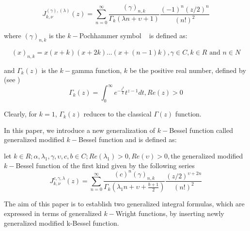 \documentclass{amsart}
\theoremstyle{plain}
\numberwithin{equation}{section}
\begin{document}
\begin{equation}
J_{k,\nu }^{\left( \gamma \right) ,\left( \lambda \right) }\left( z\right)
=\sum_{n=0}^{\infty }\frac{\left( \gamma \right) _{n,k}}{\Gamma _{k}\left(
\lambda n+\upsilon +1\right) }\frac{\left( -1\right) ^{n}\left( z/2\right)
^{n}}{\left( n!\right) ^{2}}  \label{k1}
\end{equation}

where $\left( \gamma \right) _{n,k}$ is the $k-$Pochhammer symbol \ \cite{Diaz} is defined as:

\begin{equation}
\left( x\right) _{n,k}=x\left( x+k\right) \left( x+2k\right) ...\left(
x+\left( n-1\right) k\right) ,\gamma \in C,k\in R\text{ and }n\in N
\label{k2}
\end{equation}

and $\Gamma _{k}(z)$ is the $k-$gamma function, $k$ be the positive real
number, defined by (see \cite{Diaz})\begin{equation}
\Gamma _{k}\left( z\right) =\int_{0}^{\infty }e^{-\frac{t^{k}}{k}}t^{z-1}dt,Re\left( z\right) >0  \label{k3}
\end{equation}

Clearly, for $k=1$, $\Gamma _{k}(z)$ reduces to the classical $\Gamma \left(
z\right) $ function.

In this paper, we introduce a new generalization of $k-$Bessel function
called generalized modified $k-$Bessel function and is defined as:

let $k\in R;\alpha ,\lambda _{1},\gamma ,\upsilon ,c,b\in C;Re\left( \lambda
_{1}\right) >0,Re\left( \upsilon \right) >0,$the generalized modified $k-$Bessel function of the first kind given by the following series\begin{equation}
J_{k,\nu }^{c,\gamma ,\lambda }\left( z\right) =\sum_{n=0}^{\infty }\frac{\left( c\right) ^{n}\left( \gamma \right) _{n,k}}{\Gamma _{k}\left( \lambda
_{1}n+\upsilon +\frac{b+1}{2}\right) }\frac{\left( z/2\right) ^{\upsilon +2n}}{\left( n!\right) ^{2}}  \label{k4}
\end{equation}

The aim of this paper is to establish two generalized integral formulas,
which are expressed in terms of generalized $k-$Wright functions, by
inserting newly generalized modified k-Bessel function.
\end{document}
